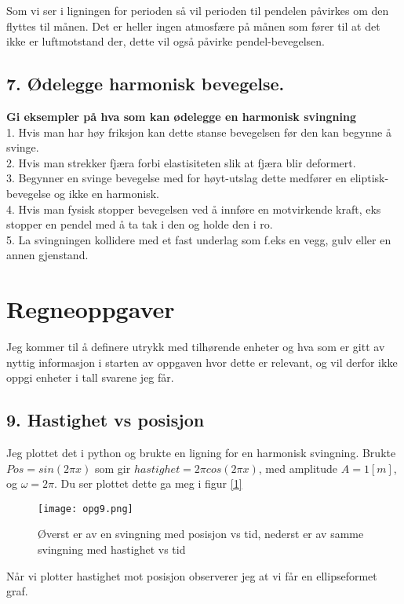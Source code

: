 \documentclass[a4paper,12pt,norsk]{article}
\begin{document}
 Som vi ser i ligningen for perioden så vil perioden til pendelen påvirkes om den flyttes til månen. Det er heller ingen atmosfære på månen som fører til at det ikke er luftmotstand der, dette vil også påvirke pendel-bevegelsen.

\subsection{7. Ødelegge harmonisk bevegelse.}
\textbf{Gi eksempler på hva som kan ødelegge en harmonisk svingning}\\
1. Hvis man har høy friksjon kan dette stanse bevegelsen før den kan begynne å svinge.\\ 
2. Hvis man strekker fjæra forbi elastisiteten slik at fjæra blir deformert. \\
3. Begynner en svinge bevegelse med for høyt-utslag dette medfører en eliptisk-bevegelse og ikke en harmonisk.\\
4. Hvis man fysisk stopper bevegelsen ved å innføre en motvirkende kraft, eks stopper en pendel med å ta tak i den og holde den i ro.\\
5. La svingningen kollidere med et fast underlag som f.eks en vegg, gulv eller en annen gjenstand.


\section{Regneoppgaver}
Jeg kommer til å definere utrykk med tilhørende enheter og hva som er gitt av nyttig informasjon i starten av oppgaven hvor dette er relevant, og vil derfor ikke oppgi enheter i tall svarene jeg får.


\subsection{9. Hastighet vs posisjon}
Jeg plottet det i python og brukte en ligning for en harmonisk svingning. Brukte $Pos = sin(2\pi x)$ som gir $hastighet = 2\pi cos(2\pi x)$, med amplitude $A = 1[m]$, og $\omega = 2\pi$. Du ser plottet dette ga meg i figur \vref{1}

\begin{figure}[h!]
\texttt{[image: opg9.png]}
\caption[Enkel harmonisk svingning]{Øverst er av en svingning med posisjon vs tid, nederst er av samme svingning med hastighet vs tid}
\label{1}
\end{figure}

Når vi plotter hastighet mot posisjon observerer jeg at vi får en ellipseformet graf. 
\end{document}

